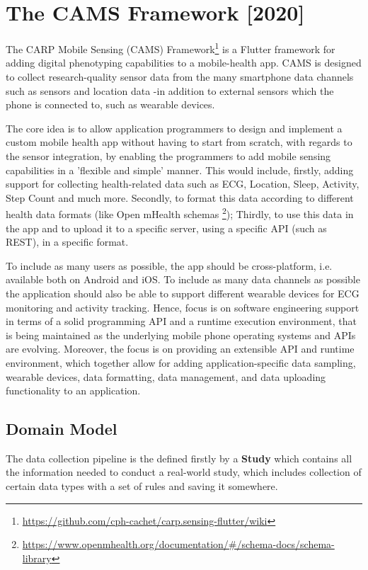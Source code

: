 \section{The CAMS Framework [2020]}
The CARP Mobile Sensing (CAMS) Framework\footnote{\url{https://github.com/cph-cachet/carp.sensing-flutter/wiki}} is a Flutter framework for adding digital phenotyping capabilities to a mobile-health app. CAMS is designed to collect research-quality sensor data from the many smartphone data channels such as sensors and location data -in addition to external sensors which the phone is connected to, such as wearable devices.  

The core idea is to allow application programmers to design and implement a custom mobile health app without having to start from scratch, with regards to the sensor integration, by enabling the programmers to add mobile sensing capabilities in a 'flexible and simple' manner. This would include, firstly, adding support for collecting health-related data such as ECG, Location, Sleep, Activity, Step Count and much more. Secondly, to format this data according to different health data formats (like Open mHealth schemas \footnote{\url{https://www.openmhealth.org/documentation/#/schema-docs/schema-library}}); Thirdly, to use this data in the app and to upload it to a specific server, using a specific API (such as REST), in a specific format.

To include as many users as possible, the app should be cross-platform, i.e. available both on Android and iOS. To include as many data channels as possible the application should also be able to support different wearable devices for ECG monitoring and activity tracking. Hence, focus is on software engineering support in terms of a solid programming API and a runtime execution environment, that is being maintained as the underlying mobile phone operating systems and APIs are evolving. Moreover, the focus is on providing an extensible API and runtime environment, which together allow for adding application-specific data sampling, wearable devices, data formatting, data management, and data uploading functionality to an application.

\subsection{Domain Model}
The data collection pipeline is the defined firstly by a \textbf{Study} which contains all the information needed to conduct a real-world study, which includes collection of certain data types with a set of rules and saving it somewhere. 

